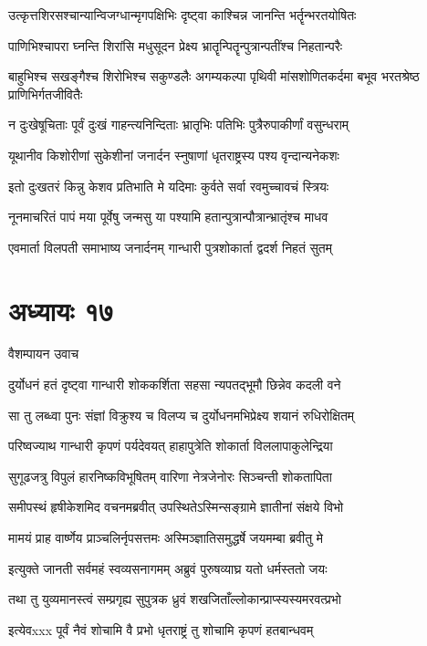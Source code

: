 \twolineshloka
{उत्कृत्तशिरसश्चान्यान्विजग्धान्मृगपक्षिभिः}
{दृष्ट्वा काश्चिन्न जानन्ति भर्तॄन्भरतयोषितः}


\twolineshloka
{पाणिभिश्चापरा घ्नन्ति शिरांसि मधुसूदन}
{प्रेक्ष्य भ्रातॄन्पितॄन्पुत्रान्पतींश्च निहतान्परैः}


\threelineshloka
{बाहुभिश्च सखङ्गैश्च शिरोभिश्च सकुण्डलैः}
{अगम्यकल्पा पृथिवी मांसशोणितकर्दमा}
{बभूव भरतश्रेष्ठ प्राणिभिर्गतजीवितैः}


\twolineshloka
{न दुःखेषूचिताः पूर्वं दुःखं गाहन्त्यनिन्दिताः}
{भ्रातृभिः पतिभिः पुत्रैरुपाकीर्णां वसुन्धराम्}


\twolineshloka
{यूथानीव किशोरीणां सुकेशीनां जनार्दन}
{स्नुषाणां धृतराष्ट्रस्य पश्य वृन्दान्यनेकशः}


\twolineshloka
{इतो दुःखतरं किन्नु केशव प्रतिभाति मे}
{यदिमाः कुर्वते सर्वा रवमुच्चावचं स्त्रियः}


\twolineshloka
{नूनमाचरितं पापं मया पूर्वेषु जन्मसु}
{या पश्यामि हतान्पुत्रान्पौत्रान्भ्रातृंश्च माधव}


\twolineshloka
{एवमार्ता विलपती समाभाष्य जनार्दनम्}
{गान्धारी पुत्रशोकार्ता द्वदर्श निहतं सुतम्}


\chapter{अध्यायः १७}
\twolineshloka
{वैशम्पायन उवाच}
{}


\twolineshloka
{दुर्योधनं हतं दृष्ट्वा गान्धारी शोककर्शिता}
{सहसा न्यपतद्भूमौ छिन्नेव कदली वने}


\twolineshloka
{सा तु लब्ध्वा पुनः संज्ञां विक्रुश्य च विलप्य च}
{दुर्योधनमभिप्रेक्ष्य शयानं रुधिरोक्षितम्}


\twolineshloka
{परिष्वज्याथ गान्धारी कृपणं पर्यदेवयत्}
{हाहापुत्रेति शोकार्ता विललापाकुलेन्द्रिया}


\twolineshloka
{सुगूढजत्रु विपुलं हारनिष्कविभूषितम्}
{वारिणा नेत्रजेनोरः सिञ्चन्ती शोकतापिता}


\twolineshloka
{समीपस्थं हृषीकेशमिद वचनमब्रवीत्}
{उपस्थितेऽस्मिन्सङ्ग्रामे ज्ञातीनां संक्षये विभो}


\twolineshloka
{मामयं प्राह वार्ष्णेय प्राञ्चलिर्नृपसत्तमः}
{अस्मिञ्ज्ञातिसमुद्धर्षे जयमम्बा ब्रवीतु मे}


\twolineshloka
{इत्युक्ते जानती सर्वमहं स्वव्यसनागमम्}
{अब्रुवं पुरुषव्याघ्र यतो धर्मस्ततो जयः}


\twolineshloka
{तथा तु युव्यमानस्त्वं सम्प्रगृह्य सुपुत्रक}
{ध्रुवं शखजिताँल्लोकान्प्राप्स्यस्यमरवत्प्रभो}


\twolineshloka
{इत्येवxxx पूर्वं नैवं शोचामि वै प्रभो}
{धृतराष्ट्रं तु शोचामि कृपणं हतबान्धवम्}


